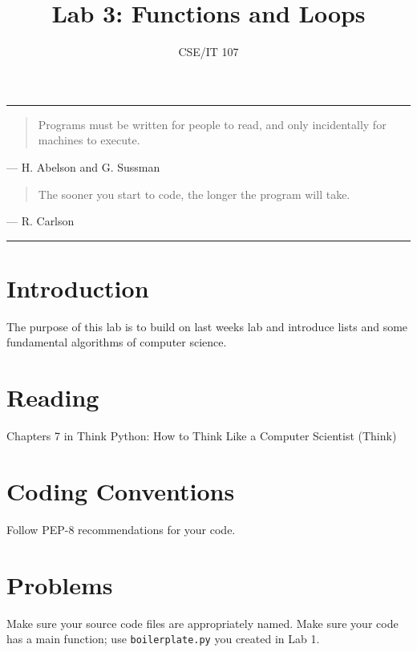 \documentclass[12pt]{article}
\title{Lab 3: Functions and Loops}
\author{CSE/IT 107}
\date{}
\begin{document}
\maketitle

\hrule
\begin{quotation}
Programs must be written for people to read, and only incidentally for machines to execute.
\end{quotation}

\begin{flushright}
---  H. Abelson and G. Sussman
\end{flushright}

\begin{quotation}
The sooner you start to code, the longer the program will take.
\end{quotation}
\begin{flushright}
--- R. Carlson 
\end{flushright}

\hrule
\section{Introduction}

The purpose of this lab is to build on last weeks lab and introduce lists and some fundamental algorithms of computer science. 

\section*{Reading}

Chapters 7 in Think Python: How to Think Like a Computer Scientist (Think)

\section*{Coding Conventions}

Follow PEP-8 recommendations for your code. 

\section*{Problems}

Make sure your source code files are appropriately named. Make sure your code has a main function; use \texttt{boilerplate.py} you created in Lab 1.
\end{document}
